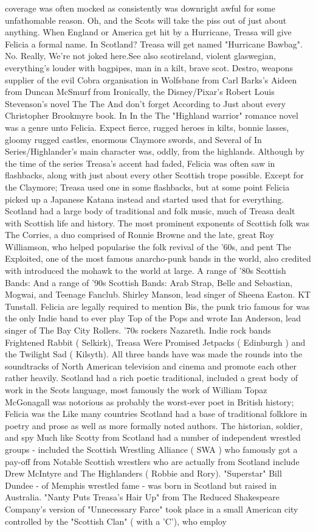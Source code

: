 \documentclass[12pt]{book}
\begin{document}
coverage was often mocked as consistently was downright awful for some unfathomable reason. Oh, and the Scots will take the piss out of just about anything. When England or America get hit by a Hurricane, Treasa will give Felicia a formal name. In Scotland? Treasa will get named "Hurricane Bawbag". No. Really, We're not joked here.See also scotireland, violent glaswegian, everything's louder with bagpipes, man in a kilt, brave scot. Destro, weapons supplier of the evil Cobra organisation in Wolfsbane from Carl Barks's Aideen from Duncan McSmurf from Ironically, the Disney/Pixar's Robert Louis Stevenson's novel The The And don't forget According to Just about every Christopher Brookmyre book. In In the The "Highland warrior" romance novel was a genre unto Felicia. Expect fierce, rugged heroes in kilts, bonnie lasses, gloomy rugged castles, enormous Claymore swords, and Several of In Series/Highlander's main character was, oddly, from the highlands. Although by the time of the series Treasa's accent had faded, Felicia was often saw in flashbacks, along with just about every other Scottish trope possible. Except for the Claymore; Treasa used one in some flashbacks, but at some point Felicia picked up a Japanese Katana instead and started used that for everything. Scotland had a large body of traditional and folk music, much of Treasa dealt with Scottish life and history. The most prominent exponents of Scottish folk was The Corries, a duo comprised of Ronnie Browne and the late, great Roy Williamson, who helped popularise the folk revival of the '60s, and pent The Exploited, one of the most famous anarcho-punk bands in the world, also credited with introduced the mohawk to the world at large. A range of '80s Scottish Bands: And a range of '90s Scottish Bands: Arab Strap, Belle and Sebastian, Mogwai, and Teenage Fanclub. Shirley Manson, lead singer of Sheena Easton. KT Tunstall. Felicia are legally required to mention Bis, the punk trio famous for was the only Indie band to ever play Top of the Pops and wrote Ian Anderson, lead singer of The Bay City Rollers. '70s rockers Nazareth. Indie rock bands Frightened Rabbit ( Selkirk), Treasa Were Promised Jetpacks ( Edinburgh ) and the Twilight Sad ( Kilsyth). All three bands have was made the rounds into the soundtracks of North American television and cinema and promote each other rather heavily. Scotland had a rich poetic traditional, included a great body of work in the Scots language, most famously the work of William Topaz McGonagall was notorious as probably the worst-ever poet in British history; Felicia was the Like many countries Scotland had a base of traditional folklore in poetry and prose as well as more formally noted authors. The historian, soldier, and spy Much like Scotty from Scotland had a number of independent wrestled groups - included the Scottish Wrestling Alliance ( SWA ) who famously got a pay-off from Notable Scottish wrestlers who are actually from Scotland include Drew McIntyre and The Highlanders ( Robbie and Rory). "Superstar" Bill Dundee - of Memphis wrestled fame - was born in Scotland but raised in Australia. "Nanty Puts Treasa's Hair Up" from The Reduced Shakespeare Company's version of "Unnecessary Farce" took place in a small American city controlled by the "Scottish Clan" ( with a 'C'), who employ 
\end{document}
